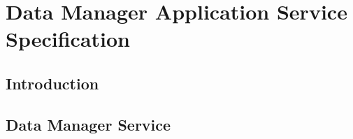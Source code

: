\chapter{Data Manager Application Service Specification}
\section{Introduction}
\section{Data Manager Service}
\orgcishellappservicedatamanager{}